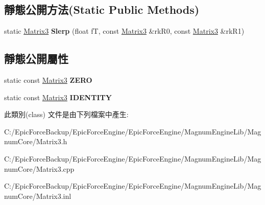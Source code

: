 \subsection*{靜態公開方法(Static Public Methods)}
\begin{DoxyCompactItemize}
\item 
static \hyperlink{class_magnum_1_1_matrix3}{Matrix3} {\bfseries Slerp} (float fT, const \hyperlink{class_magnum_1_1_matrix3}{Matrix3} \&rk\+R0, const \hyperlink{class_magnum_1_1_matrix3}{Matrix3} \&rk\+R1)\hypertarget{class_magnum_1_1_matrix3_adbd8dbc198902751e224a4cb2245f5fb}{}\label{class_magnum_1_1_matrix3_adbd8dbc198902751e224a4cb2245f5fb}

\end{DoxyCompactItemize}
\subsection*{靜態公開屬性}
\begin{DoxyCompactItemize}
\item 
static const \hyperlink{class_magnum_1_1_matrix3}{Matrix3} {\bfseries Z\+E\+RO}\hypertarget{class_magnum_1_1_matrix3_a2c124ecb12e7ce1635d0b146c6679076}{}\label{class_magnum_1_1_matrix3_a2c124ecb12e7ce1635d0b146c6679076}

\item 
static const \hyperlink{class_magnum_1_1_matrix3}{Matrix3} {\bfseries I\+D\+E\+N\+T\+I\+TY}\hypertarget{class_magnum_1_1_matrix3_ad7b90e3fae2bf05559fbee367a45b9ce}{}\label{class_magnum_1_1_matrix3_ad7b90e3fae2bf05559fbee367a45b9ce}

\end{DoxyCompactItemize}


此類別(class) 文件是由下列檔案中產生\+:\begin{DoxyCompactItemize}
\item 
C\+:/\+Epic\+Force\+Backup/\+Epic\+Force\+Engine/\+Epic\+Force\+Engine/\+Magnum\+Engine\+Lib/\+Magnum\+Core/Matrix3.\+h\item 
C\+:/\+Epic\+Force\+Backup/\+Epic\+Force\+Engine/\+Epic\+Force\+Engine/\+Magnum\+Engine\+Lib/\+Magnum\+Core/Matrix3.\+cpp\item 
C\+:/\+Epic\+Force\+Backup/\+Epic\+Force\+Engine/\+Epic\+Force\+Engine/\+Magnum\+Engine\+Lib/\+Magnum\+Core/Matrix3.\+inl\end{DoxyCompactItemize}
